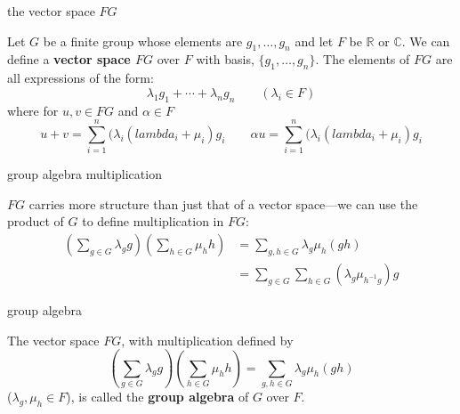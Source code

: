 \documentclass[avery5371,grid]{flashcards}
\newcommand{\R}{\mathbb{R}}
\newcommand{\C}{\mathbb{C}}
\newcommand{\defn}[1]{\textbf{#1}}
\begin{document}
\begin{flashcard}[Definition]{the vector space $FG$}

  Let $G$ be a finite group whose elements are $g_1, \ldots, g_n$ and
  let $F$ be $\R$ or $\C$. We can define a \defn{vector space $FG$} over
  $F$ with basis, $\{g_1, \ldots, g_n \}$. The elements of $FG$ are
  all expressions of the form:
  \[
    \lambda_1 g_1 + \cdots + \lambda_n g_n \qquad (\lambda_i \in F)
  \]
  where for $u,v \in FG$ and $\alpha \in F$
  \[
    u+v = \sum_{i=1}^n (\lambda_i (lambda_i + \mu_i)g_i \qquad
    \alpha u = \sum_{i=1}^n (\lambda_i (lambda_i + \mu_i)g_i
  \]

\end{flashcard}

\begin{flashcard}[Definition]{group algebra multiplication}

  $FG$ carries more structure than just that of a vector space---we
  can use the product of $G$ to define multiplication in $FG$:
  \begin{align*}
    \left( \sum_{g\in G} \lambda_g g \right) \left( \sum_{h\in G} \mu_h h \right)
    &= \sum_{g,h \in G} \lambda_g \mu_h (gh) \\
    &= \sum_{g \in G} \sum_{h \in G} (\lambda_g \mu_{h^{-1}g}) g
  \end{align*}

\end{flashcard}

\begin{flashcard}[Definition]{group algebra}

  The vector space $FG$, with multiplication defined by
  \[
    \left( \sum_{g\in G} \lambda_g g \right) \left( \sum_{h\in G}
      \mu_h h \right) = \sum_{g,h \in G} \lambda_g \mu_h (gh)
  \]
  ($\lambda_g, \mu_h \in F$), is called the \defn{group algebra} of
  $G$ over $F$.

\end{flashcard}



\end{document}
